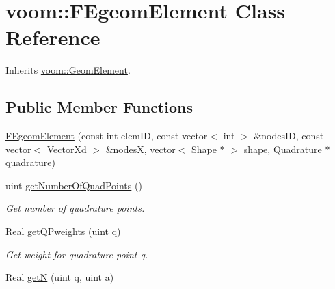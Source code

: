\hypertarget{classvoom_1_1_f_egeom_element}{
\section{voom::FEgeomElement Class Reference}
\label{classvoom_1_1_f_egeom_element}
}


Inherits \hyperlink{classvoom_1_1_geom_element}{voom::GeomElement}.\subsection*{Public Member Functions}
\begin{DoxyCompactItemize}
\item 
\hyperlink{classvoom_1_1_f_egeom_element_a13005c4ebd13547328c665e0413a6e35}{FEgeomElement} (const int elemID, const vector$<$ int $>$ \&nodesID, const vector$<$ VectorXd $>$ \&nodesX, vector$<$ \hyperlink{classvoom_1_1_shape}{Shape} $\ast$ $>$ shape, \hyperlink{classvoom_1_1_quadrature}{Quadrature} $\ast$quadrature)
\item 
\hypertarget{classvoom_1_1_f_egeom_element_a21f4d5b22a360433f015a8f3201117cb}{
uint \hyperlink{classvoom_1_1_f_egeom_element_a21f4d5b22a360433f015a8f3201117cb}{getNumberOfQuadPoints} ()}
\label{classvoom_1_1_f_egeom_element_a21f4d5b22a360433f015a8f3201117cb}

\begin{DoxyCompactList}\small\item\em Get number of quadrature points. \item\end{DoxyCompactList}\item 
\hypertarget{classvoom_1_1_f_egeom_element_aeae0bbf47871f9271eacb5f570949cfb}{
Real \hyperlink{classvoom_1_1_f_egeom_element_aeae0bbf47871f9271eacb5f570949cfb}{getQPweights} (uint q)}
\label{classvoom_1_1_f_egeom_element_aeae0bbf47871f9271eacb5f570949cfb}

\begin{DoxyCompactList}\small\item\em Get weight for quadrature point q. \item\end{DoxyCompactList}\item 
\hypertarget{classvoom_1_1_f_egeom_element_a8411a573d378724bfdbdc19f18cb63ee}{
Real \hyperlink{classvoom_1_1_f_egeom_element_a8411a573d378724bfdbdc19f18cb63ee}{getN} (uint q, uint a)}
\label{classvoom_1_1_f_egeom_element_a8411a573d378724bfdbdc19f18cb63ee}


\end{DoxyCompactItemize}

